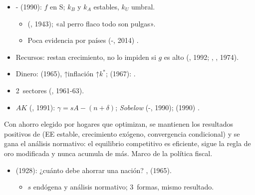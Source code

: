 \documentclass{article}
\begin{document}
\begin{columnas}
\begin{itemize}
\item {}- (1990): $f$ en S; $k_B$ y $k_A$ estables, $k_U$ umbral.
  \begin{itemize}
  \item {} (, 1943); «al perro flaco todo son pulgas».
  \item Poca evidencia por países (-, 2014) .
  \end{itemize}
\end{itemize}
\begin{itemize}
\item Recursos: restan crecimiento, no lo impiden si $g$ es alto (, 1992; , , 1974).
\item Dinero:  (1965), ↑inflación ↑$k^*$;  (1967):  .
\item 2~sectores (, 1961-63).
\end{itemize}
\begin{itemize}
\item $AK$ (, 1991): $\gamma=sA-(n+\delta)$; \emph{Sobelow} (-, 1990);  (1990) .
\end{itemize}

\begin{ideaclave}
Con ahorro elegido por hogares que optimizan, se mantienen los resultados positivos de  (EE estable, crecimiento exógeno, convergencia condicional) y se gana el análisis normativo: el equilibrio competitivo es eficiente, sigue la regla de oro modificada y nunca acumula de más. Marco de la política fiscal.
\end{ideaclave}

\begin{itemize}
\item {} (1928): ¿cuánto debe ahorrar una nación? ,  (1965).
  \begin{itemize}
  \item $s$ endógena y análisis normativo; 3~formas, mismo resultado.
  \end{itemize}
\end{itemize}


\end{columnas}
\end{document}
